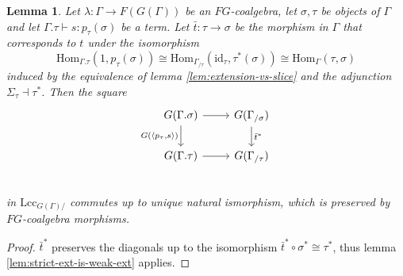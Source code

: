 \documentclass[a4paper]{article}
\newtheorem{lemma}[theorem]{Lemma}
\theoremstyle{remark}
\theoremstyle{definition}
\begin{document}
\begin{lemma}
  \label{lem:substitution-vs-pullback}
  Let $\lambda : \Gamma \rightarrow F(G(\Gamma))$ be an $FG$-coalgebra, let $\sigma, \tau$ be objects of $\Gamma$ and let $\Gamma.\tau \vdash s : p_\tau(\sigma)$ be a term.
  Let $\bar t : \tau \rightarrow \sigma$ be the morphism in $\Gamma$ that corresponds to $t$ under the isomorphism
  \begin{equation}
    \mathrm{Hom}_{\Gamma.\tau}(1, p_\tau(\sigma)) \cong \mathrm{Hom}_{\Gamma_{/ \tau}}(\mathrm{id}_\tau, \tau^*(\sigma)) \cong \mathrm{Hom}_\Gamma(\tau, \sigma)
  \end{equation}
  induced by the equivalence of lemma \ref{lem:extension-vs-slice} and the adjunction $\Sigma_\tau \dashv \tau^*$.
  Then the square
  \begin{equation}
    \begin{tikzcd}
      G(\Gamma.\sigma) \arrow[r] \arrow[d, "{G(\langle p_\tau, s \rangle)}"'] & G(\Gamma_{/ \sigma}) \arrow[d, "\bar t^*"] \\
      G(\Gamma.\tau) \arrow[r] & G(\Gamma_{/ \tau}) \\
    \end{tikzcd}
  \end{equation}
  in $\mathrm{Lcc}_{G(\Gamma)/ }$ commutes up to unique natural ismorphism, which is preserved by $FG$-coalgebra morphisms.
\end{lemma}
\begin{proof}
  $\bar t^*$ preserves the diagonals up to the isomorphism $\bar t^* \circ \sigma^* \cong \tau^*$, thus lemma \ref{lem:strict-ext-is-weak-ext} applies.
\end{proof}
\end{document}
